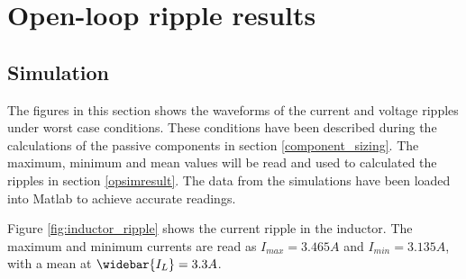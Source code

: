 
\chapter{Open-loop ripple results}
 \label{app:OL_ripple}
\section{Simulation}
The figures in this section shows the waveforms of the current and voltage ripples under worst case conditions. These conditions have been described during the calculations of the passive components in section \ref{component_sizing}. The maximum, minimum and mean values will be read and used to calculated the ripples in section \ref{opsimresult}. The data from the simulations have been loaded into Matlab to achieve accurate readings.

Figure \ref{fig:inductor_ripple} shows the current ripple in the inductor. The maximum and minimum currents are read as $I_{max} = 3.465A$ and $I_{min} = 3.135A$, with a mean at $\widebar{I_L} = 3.3A$.


